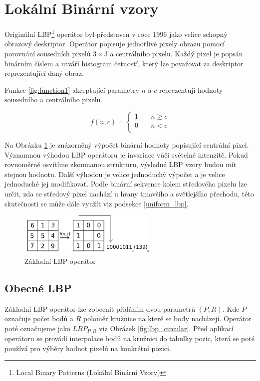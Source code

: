 \documentclass[czech,BP]{thesiskiv}
\begin{document}
\section{Lokální Binární vzory}
Originální LBP\footnote{Local Binary Patterns (Lokální Binární Vzory)} operátor byl představen v roce 1996 jako velice schopný obrazový deskriptor. Operátor popisuje jednotlivé pixely obrazu pomocí porovnání sousedních pixelů $3\times3$ a centrálního pixelu. Každý pixel je popsán binárním číslem a utváří histogram četností, který lze považovat za deskriptor reprezentující daný obraz. \citet{Ahonen2004} 

Funkce \ref{fig:function1} akceptující parametry $n$ a $c$ reprezentují hodnoty sousedního a centrálního pixelu.  

\begin{equation} \label{fig:function1}
f(n,c) = \begin{cases}
    1  & \quad n \geq c\\
    0  & \quad n < c\\
  \end{cases}
\end{equation}

Na Obrázku \ref{fig:lbp_basic} je znázorněný výpočet binární hodnoty popisující centrální pixel. Významnou výhodou LBP operátoru je invariace vůči světelné intenzitě. Pokud rovnoměrně osvítíme zkoumanou strukturu, výsledné LBP vzory budou mít stejnou hodnotu. Další výhodou je velice jednoduchý výpočet a je velice jednoduché jej modifikovat. Podle binární sekvence kolem středového pixelu lze určit, zda se středový pixel nachází u hrany tmavšího a světlejšího přechodu, této skutečnosti se může dále využít viz podsekce \ref{uniform_lbp}.

\begin{figure}[h!]
\begin{center}
\includegraphics[width=250px]{img/LBP_basic.png}
\caption{Základní LBP operátor}
\label{fig:lbp_basic}
\end{center}
\end{figure}

\subsection{Obecné LBP}
Základní LBP operátor lze zobecnit přidáním dvou parametrů $(P,R)$. Kde $P$ označuje počet bodů a $R$ poloměr kružnice na které se body nacházejí. Operátor poté označujeme jako $LBP_{P,R}$ viz Obrázek \ref{fig:lbp_circular}. Před aplikací operátoru se provádí interpolace bodů na kružnici do tabulky pozic, která se poté používá pro výběry hodnot pixelů na konkrétní pozici.
\end{document}
